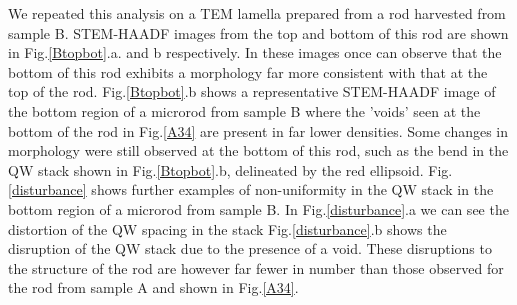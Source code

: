 We repeated this analysis on a TEM lamella prepared from a rod harvested from sample B. STEM-HAADF images from the top and bottom of this rod are shown in Fig.\ref{Btopbot}.a. and b respectively. In these images once can observe that the bottom of this rod exhibits a morphology far more consistent with that at the top of the rod. Fig.\ref{Btopbot}.b shows a representative STEM-HAADF image of the bottom region of a microrod from sample B where the 'voids' seen at the bottom of the rod in Fig.\ref{A34} are present in far lower densities.
Some changes in morphology were still observed at the bottom of this rod, such as the bend in the QW stack shown in Fig.\ref{Btopbot}.b, delineated by the red ellipsoid. Fig.\ref{disturbance} shows further examples of non-uniformity in the QW stack in the bottom region of a microrod from sample B. In Fig.\ref{disturbance}.a we can see the distortion of the QW spacing in the stack Fig.\ref{disturbance}.b shows the disruption of the QW stack due to the presence of a void. These disruptions to the structure of the rod are however far fewer in number than those observed for the rod from sample A and shown in Fig.\ref{A34}. 

